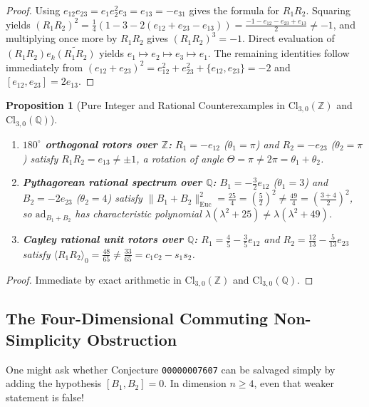 \documentclass[11pt]{article}
\newtheorem{proposition}[theorem]{Proposition}
\theoremstyle{definition}
\newcommand{\Cl}{\mathrm{Cl}}
\newcommand{\ad}{\mathrm{ad}}
\newcommand{\Euc}{\mathrm{Euc}}
\newcommand{\rev}[1]{\widetilde{#1}}
\newcommand{\grade}[2]{\langle #1 \rangle_{#2}}
\begin{document}
\begin{proof}
Using $e_{12} e_{23} = e_1 e_2^2 e_3 = e_{13} = -e_{31}$ gives the formula for $R_1 R_2$.
Squaring yields $(R_1 R_2)^2 = \frac{1}{4}(1 - 3 - 2(e_{12} + e_{23} - e_{13}))
= \frac{-1 - e_{12} - e_{23} + e_{13}}{2} \neq -1$, and multiplying once more by $R_1 R_2$
gives $(R_1 R_2)^3 = -1$. Direct evaluation of $(R_1 R_2) e_k \rev{(R_1 R_2)}$ yields
$e_1 \mapsto e_2 \mapsto e_3 \mapsto e_1$. The remaining identities follow immediately from
$(e_{12} + e_{23})^2 = e_{12}^2 + e_{23}^2 + \{e_{12}, e_{23}\} = -2$ and
$[e_{12}, e_{23}] = 2e_{13}$.
\end{proof}

\begin{proposition}[Pure Integer and Rational Counterexamples in $\Cl_{3,0}(\mathbb{Z})$ and $\Cl_{3,0}(\mathbb{Q})$]\label{prop:rational-3d}
\leavevmode
\begin{enumerate}
  \item \textbf{$180^\circ$ orthogonal rotors over $\mathbb{Z}$:} $R_1 = -e_{12}$
    ($\theta_1 = \pi$) and $R_2 = -e_{23}$ ($\theta_2 = \pi$) satisfy
    $R_1 R_2 = e_{13} \neq \pm 1$, a rotation of angle $\Theta = \pi \neq 2\pi = \theta_1 + \theta_2$.
  \item \textbf{Pythagorean rational spectrum over $\mathbb{Q}$:} $B_1 = -\frac{3}{2}e_{12}$
    ($\theta_1 = 3$) and $B_2 = -2e_{23}$ ($\theta_2 = 4$) satisfy
    $\|B_1 + B_2\|_{\Euc}^2 = \frac{25}{4} = (\frac{5}{2})^2 \neq \frac{49}{4} = (\frac{3+4}{2})^2$,
    so $\ad_{B_1 + B_2}$ has characteristic polynomial $\lambda(\lambda^2 + 25) \neq
    \lambda(\lambda^2 + 49)$.
  \item \textbf{Cayley rational unit rotors over $\mathbb{Q}$:} $R_1 = \frac{4}{5} - \frac{3}{5}e_{12}$
    and $R_2 = \frac{12}{13} - \frac{5}{13}e_{23}$ satisfy
    $\grade{R_1 R_2}{0} = \frac{48}{65} \neq \frac{33}{65} = c_1 c_2 - s_1 s_2$.
\end{enumerate}
\end{proposition}

\begin{proof}
Immediate by exact arithmetic in $\Cl_{3,0}(\mathbb{Z})$ and $\Cl_{3,0}(\mathbb{Q})$.
\end{proof}

\subsection{The Four-Dimensional Commuting Non-Simplicity Obstruction}

One might ask whether Conjecture \texttt{00000007607} can be salvaged simply by adding the
hypothesis $[B_1, B_2] = 0$. In dimension $n \ge 4$, even that weaker statement is false!
\end{document}
